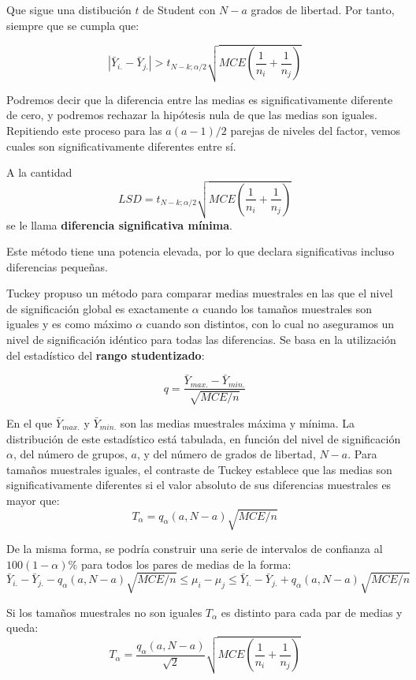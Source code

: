 Que sigue una distibuci\'on $t$ de Student con $N-a$ grados de libertad. Por tanto, siempre que se cumpla que:

\[|\bar{Y}_{i.}-\bar{Y}_{j.}|>t_{N-k;\alpha/2}\sqrt{MCE\left(\dfrac{1}{n_i}+\dfrac{1}{n_j}\right)}\]

Podremos decir que la diferencia entre las medias es significativamente diferente de cero, y podremos rechazar la hip\'otesis nula de que las medias son iguales. Repitiendo este proceso para las $a(a-1)/2$ parejas de niveles del factor, vemos cuales son significativamente diferentes entre s\'i.

A la cantidad
\[LSD=t_{N-k;\alpha/2}\sqrt{MCE\left(\dfrac{1}{n_i}+\dfrac{1}{n_j}\right)}\]
se le llama \textbf{diferencia significativa m\'inima}.

Este m\'etodo tiene una potencia elevada, por lo que declara significativas incluso diferencias peque\~nas.



Tuckey propuso un m\'etodo para comparar medias muestrales en las que el nivel de significaci\'on global es exactamente $\alpha$ cuando los tama\~nos muestrales son iguales y es como m\'aximo $\alpha$ cuando son distintos, con lo cual no aseguramos un nivel de significaci\'on id\'entico para todas las diferencias. Se basa en la utilizaci\'on del estad\'istico del \textbf{rango studentizado}:

\[q=\dfrac{\bar{Y}_{max.}-\bar{Y}_{min.}}{\sqrt{MCE/n}}\]

En el que $\bar{Y}_{max.}$ y $\bar{Y}_{min.}$ son las medias muestrales m\'axima y m\'inima. La distribuci\'on de este estad\'istico est\'a tabulada, en funci\'on del nivel de significaci\'on $\alpha$, del n\'umero de grupos, $a$, y del n\'umero de grados de libertad, $N-a$. Para tama\~nos muestrales iguales, el contraste de Tuckey establece que las medias son significativamente diferentes si el valor absoluto de sus diferencias muestrales es mayor que:
\[T_{\alpha}=q_{\alpha}(a,N-a)\sqrt{MCE/n}\]

De la misma forma, se podr\'ia construir una serie de intervalos de confianza al $100(1-\alpha)\%$ para todos los pares de medias de la forma:
\[\bar{Y}_{i.}-\bar{Y}_{j.}-q_{\alpha}(a,N-a)\sqrt{MCE/n}\leq\mu_i-\mu_j\leq\bar{Y}_{i.}-\bar{Y}_{j.}+q_{\alpha}(a,N-a)\sqrt{MCE/n}\]

Si los tama\~nos muestrales no son iguales $T_{\alpha}$ es distinto para cada par de medias y queda:
\[T_{\alpha}=\dfrac{q_{\alpha}(a,N-a)}{\sqrt{2}}\sqrt{MCE\left(\dfrac{1}{n_i}+\dfrac{1}{n_j}\right)}\]

